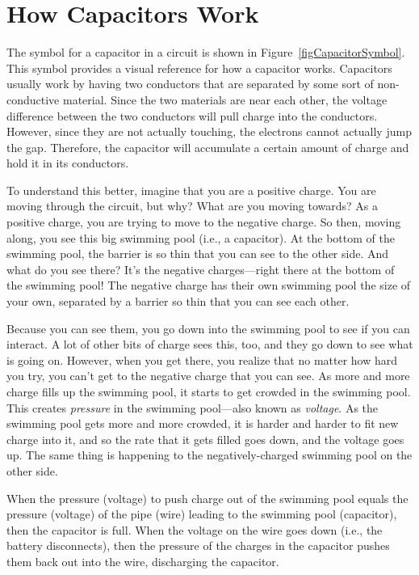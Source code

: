 \section{How Capacitors Work}


The symbol for a capacitor in a circuit is shown in Figure~\ref{figCapacitorSymbol}.
This symbol provides a visual reference for how a capacitor works.
Capacitors usually work by having two conductors that are separated by some sort of non-conductive material.
Since the two materials are near each other, the voltage difference between the two conductors will pull charge into the conductors.  
However, since they are not actually touching, the electrons cannot actually jump the gap.
Therefore, the capacitor will accumulate a certain amount of charge and hold it in its conductors.

To understand this better, imagine that you are a positive charge.
You are moving through the circuit, but why?  What are you moving towards?
As a positive charge, you are trying to move to the negative charge.
So then, moving along, you see this big swimming pool (i.e., a capacitor).
At the bottom of the swimming pool, the barrier is so thin that you can see to the other side.
And what do you see there?  
It's the negative charges---right there at the bottom of the swimming pool!
The negative charge has their own swimming pool the size of your own, separated by a barrier so thin that you can see each other.

Because you can see them, you go down into the swimming pool to see if you can interact.
A lot of other bits of charge sees this, too, and they go down to see what is going on.
However, when you get there, you realize that no matter how hard you try, you can't get to the negative charge that you can see.
As more and more charge fills up the swimming pool, it starts to get crowded in the swimming pool.
This creates \emph{pressure} in the swimming pool---also known as \emph{voltage}.
As the swimming pool gets more and more crowded, it is harder and harder to fit new charge into it, and so the rate that it gets filled goes down, and the voltage goes up.
The same thing is happening to the negatively-charged swimming pool on the other side.

When the pressure (voltage) to push charge out of the swimming pool equals the pressure (voltage) of the pipe (wire) leading to the swimming pool (capacitor), then the capacitor is full.
When the voltage on the wire goes down (i.e., the battery disconnects), then the pressure of the charges in the capacitor pushes them back out into the wire, discharging the capacitor.

